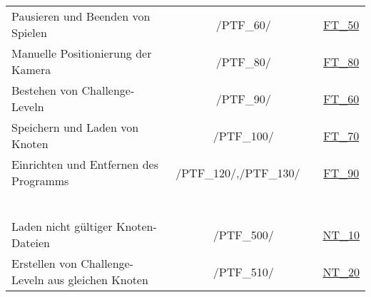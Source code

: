 \begin{longtable}{p{0.5\hsize}p{0.275\hsize}p{0.275\hsize}}
	\\
	
	  \multicolumn{1}{L{6.5cm}}{Pausieren und Beenden von Spielen}
	& \multicolumn{1}{c}{/PTF\_60/}
	& \multicolumn{1}{c}{\hyperref[FT:50]{FT\_50}}
	
	\\
	
	  \multicolumn{1}{L{6.5cm}}{Manuelle Positionierung der Kamera}
	& \multicolumn{1}{c}{/PTF\_80/}
	& \multicolumn{1}{c}{\hyperref[FT:80]{FT\_80}}
	
	\\
	
	  \multicolumn{1}{L{6.5cm}}{Bestehen von Challenge-Leveln}
	& \multicolumn{1}{c}{/PTF\_90/}
	& \multicolumn{1}{c}{\hyperref[FT:60]{FT\_60}}
	
	\\
	
	  \multicolumn{1}{L{6.5cm}}{Speichern und Laden von Knoten}
	& \multicolumn{1}{c}{/PTF\_100/}
	& \multicolumn{1}{c}{\hyperref[FT:70]{FT\_70}}
	
	\\
	
	  \multicolumn{1}{L{6.5cm}}{Einrichten und Entfernen des Programms}
	& \multicolumn{1}{C{3cm}}{/PTF\_120/,\newline/PTF\_130/~~}
	& \multicolumn{1}{c}{\hyperref[FT:TEST90]{FT\_90}}
	
	\\
	


\newpage




	  \multicolumn{3}{l}{\textbf{Negativtests:}}
	  
	\\
	
	  \multicolumn{3}{l}{~}
	  
	\\
	
	  \multicolumn{1}{L{6.5cm}}{Laden nicht gültiger Knoten-Dateien}
	& \multicolumn{1}{c}{/PTF\_500/}
	& \multicolumn{1}{c}{\hyperref[NT:10]{NT\_10}}
	
	\\
	
	  \multicolumn{1}{L{6.5cm}}{Erstellen von Challenge-Leveln aus gleichen Knoten}
	& \multicolumn{1}{c}{/PTF\_510/}
	& \multicolumn{1}{c}{\hyperref[NT:20]{NT\_20}}
	
	\\
	

\end{longtable}
